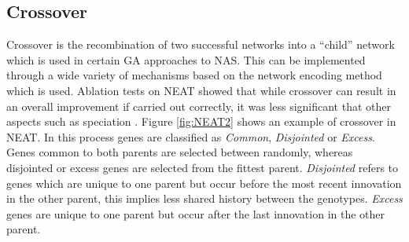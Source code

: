 	\subsection{Crossover}\label{crossover}

		Crossover is the recombination of two successful networks into a “child” network which is used in certain GA approaches to NAS. \cite{3}\cite{24}\cite{5} This can be implemented through a wide variety of mechanisms based on the network encoding method which is used. Ablation tests on NEAT showed that while crossover can result in an overall improvement if carried out correctly, it was less significant that other aspects such as speciation \cite{5}\cite{24}. Figure \ref{fig:NEAT2} shows an example of crossover in NEAT. In this process genes are classified as \textit{Common}, \textit{Disjointed} or \textit{Excess}. Genes common to both parents are selected between randomly, whereas disjointed or excess genes are selected from the fittest parent. \textit{Disjointed} refers to genes which are unique to one parent but occur before the most recent innovation in the other parent, this implies less shared history between the genotypes. \textit{Excess} genes are unique to one parent but occur after the last innovation in the other parent.



